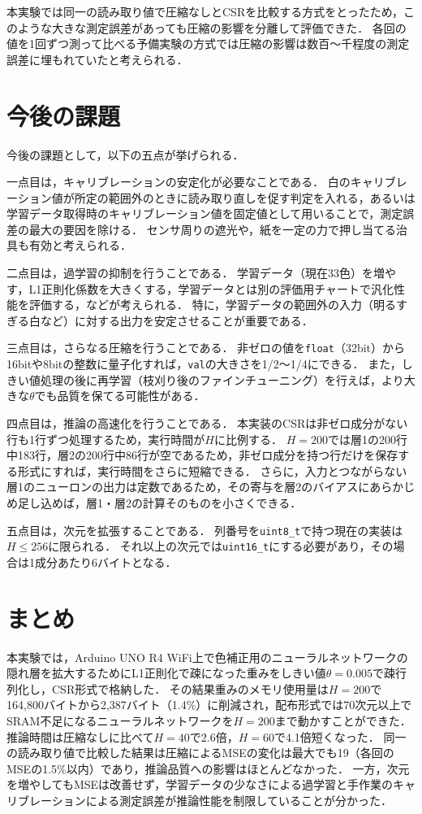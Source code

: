 \documentclass[a4paper,11pt,uplatex,dvipdfmx]{jsarticle}
\begin{document}
本実験では同一の読み取り値で圧縮なしとCSRを比較する方式をとったため，このような大きな測定誤差があっても圧縮の影響を分離して評価できた．
各回の値を1回ずつ測って比べる予備実験の方式では圧縮の影響は数百〜千程度の測定誤差に埋もれていたと考えられる．

\section{今後の課題}
今後の課題として，以下の五点が挙げられる．

一点目は，キャリブレーションの安定化が必要なことである．
白のキャリブレーション値が所定の範囲外のときに読み取り直しを促す判定を入れる，あるいは学習データ取得時のキャリブレーション値を固定値として用いることで，測定誤差の最大の要因を除ける．
センサ周りの遮光や，紙を一定の力で押し当てる治具も有効と考えられる．

二点目は，過学習の抑制を行うことである．
学習データ（現在33色）を増やす，L1正則化係数を大きくする，学習データとは別の評価用チャートで汎化性能を評価する，などが考えられる．
特に，学習データの範囲外の入力（明るすぎる白など）に対する出力を安定させることが重要である．

三点目は，さらなる圧縮を行うことである．
非ゼロの値を\texttt{float}（32bit）から16bitや8bitの整数に量子化すれば，\texttt{val}の大きさを1/2〜1/4にできる\cite{han2016deep}．
また，しきい値処理の後に再学習（枝刈り後のファインチューニング）を行えば，より大きな$\theta$でも品質を保てる可能性がある．

四点目は，推論の高速化を行うことである．
本実装のCSRは非ゼロ成分がない行も1行ずつ処理するため，実行時間が$H$に比例する．
$H=200$では層1の200行中183行，層2の200行中86行が空であるため，非ゼロ成分を持つ行だけを保存する形式にすれば，実行時間をさらに短縮できる．
さらに，入力とつながらない層1のニューロンの出力は定数であるため，その寄与を層2のバイアスにあらかじめ足し込めば，層1・層2の計算そのものを小さくできる．

五点目は，次元を拡張することである．
列番号を\texttt{uint8\_t}で持つ現在の実装は$H \leq 256$に限られる．
それ以上の次元では\texttt{uint16\_t}にする必要があり，その場合は1成分あたり6バイトとなる．

\section{まとめ}
本実験では，Arduino UNO R4 WiFi上で色補正用のニューラルネットワークの隠れ層を拡大するためにL1正則化で疎になった重みをしきい値$\theta=0.005$で疎行列化し，CSR形式で格納した．
その結果重みのメモリ使用量は$H=200$で164{,}800バイトから2{,}387バイト（1.4\%）に削減され，配布形式では70次元以上でSRAM不足になるニューラルネットワークを$H=200$まで動かすことができた．
推論時間は圧縮なしに比べて$H=40$で2.6倍，$H=60$で4.1倍短くなった．
同一の読み取り値で比較した結果は圧縮によるMSEの変化は最大でも19（各回のMSEの1.5\%以内）であり，推論品質への影響はほとんどなかった．
一方，次元を増やしてもMSEは改善せず，学習データの少なさによる過学習と手作業のキャリブレーションによる測定誤差が推論性能を制限していることが分かった．
\end{document}
